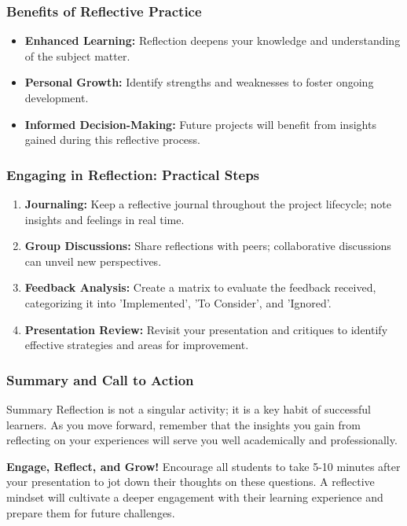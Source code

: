 \documentclass{beamer}
\begin{document}
\begin{frame}[fragile]
    \frametitle{Benefits of Reflective Practice}
    \begin{itemize}
        \item \textbf{Enhanced Learning:} Reflection deepens your knowledge and understanding of the subject matter.
        \item \textbf{Personal Growth:} Identify strengths and weaknesses to foster ongoing development.
        \item \textbf{Informed Decision-Making:} Future projects will benefit from insights gained during this reflective process.
    \end{itemize}
\end{frame}

\begin{frame}[fragile]
    \frametitle{Engaging in Reflection: Practical Steps}
    \begin{enumerate}
        \item \textbf{Journaling:} Keep a reflective journal throughout the project lifecycle; note insights and feelings in real time.
        \item \textbf{Group Discussions:} Share reflections with peers; collaborative discussions can unveil new perspectives.
        \item \textbf{Feedback Analysis:} Create a matrix to evaluate the feedback received, categorizing it into 'Implemented', 'To Consider', and 'Ignored'.
        \item \textbf{Presentation Review:} Revisit your presentation and critiques to identify effective strategies and areas for improvement.
    \end{enumerate}
\end{frame}

\begin{frame}[fragile]
    \frametitle{Summary and Call to Action}
    \begin{block}{Summary}
        Reflection is not a singular activity; it is a key habit of successful learners. As you move forward, remember that the insights you gain from reflecting on your experiences will serve you well academically and professionally.
    \end{block}
    
    \textbf{Engage, Reflect, and Grow!} Encourage all students to take 5-10 minutes after your presentation to jot down their thoughts on these questions. A reflective mindset will cultivate a deeper engagement with their learning experience and prepare them for future challenges.
\end{frame}
\end{document}

